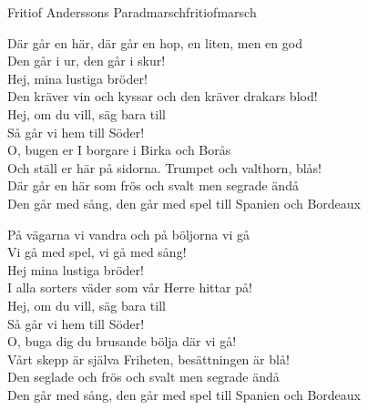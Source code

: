 \begin{song}{Fritiof Anderssons Paradmarsch}{fritiofmarsch}
\begin{vers}
Där går en här, där går en hop, en liten, men en god\\
Den går i ur, den går i skur!\\
Hej, mina lustiga bröder!\\
Den kräver vin och kyssar och den kräver drakars blod!\\
Hej, om du vill, säg bara till\\
Så går vi hem till Söder!\\
O, bugen er I borgare i Birka och Borås\\
Och ställ er här på sidorna. Trumpet och valthorn, blås!\\
Där går en här som frös och svalt men segrade ändå\\
Den går med sång, den går med spel till Spanien och Bordeaux\\
\end{vers}
\begin{vers}
På vägarna vi vandra och på böljorna vi gå\\
Vi gå med spel, vi gå med sång!\\
Hej mina lustiga bröder!\\
I alla sorters väder som vår Herre hittar på!\\
Hej, om du vill, säg bara till\\
Så går vi hem till Söder!\\
O, buga dig du brusande bölja där vi gå!\\
Vårt skepp är själva Friheten, besättningen är blå!\\
Den seglade och frös och svalt men segrade ändå\\
Den går med sång, den går med spel till Spanien och Bordeaux\\
\end{vers}
\end{song}
